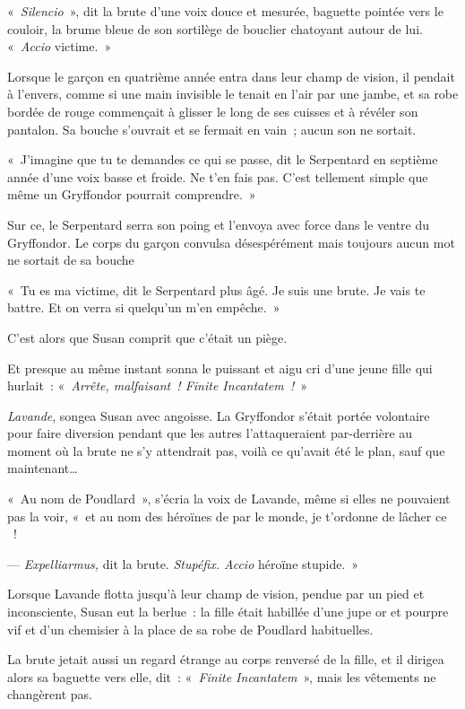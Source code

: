 «~\emph{Silencio}~», dit la brute d'une voix douce et mesurée, baguette pointée vers le couloir, la brume bleue de son sortilège de bouclier chatoyant autour de lui.
«~\emph{Accio} victime.~»

Lorsque le garçon en quatrième année entra dans leur champ de vision, il pendait à l'envers, comme si une main invisible le tenait en l'air par une jambe, et sa robe bordée de rouge commençait à glisser le long de ses cuisses et à révéler son pantalon.
Sa bouche s'ouvrait et se fermait en vain~; aucun son ne sortait.

«~J'imagine que tu te demandes ce qui se passe, dit le Serpentard en septième année d'une voix basse et froide.
Ne t'en fais pas.
C'est tellement simple que même un Gryffondor pourrait comprendre.~»

Sur ce, le Serpentard serra son poing et l'envoya avec force dans le ventre du Gryffondor.
Le corps du garçon convulsa désespérément mais toujours aucun mot ne sortait de sa bouche

«~Tu es ma victime, dit le Serpentard plus âgé.
Je suis une brute.
Je vais te battre.
Et on verra si quelqu'un m'en empêche.~»

C'est alors que Susan comprit que c'était un piège.

Et presque au même instant sonna le puissant et aigu cri d'une jeune fille qui hurlait~: «~\emph{Arrête, malfaisant~!
Finite Incantatem~!}~»

\emph{Lavande}, songea Susan avec angoisse.
La Gryffondor s'était portée volontaire pour faire diversion pendant que les autres l'attaqueraient par-derrière au moment où la brute ne s'y attendrait pas, voilà ce qu'avait été le plan, sauf que maintenant…

«~Au nom de Poudlard~», s'écria la voix de Lavande, même si elles ne pouvaient pas la voir, «~et au nom des héroïnes de par le monde, je t'ordonne de lâcher ce ~!

--- \emph{Expelliarmus,} dit la brute.
\emph{Stupéfix.
Accio} héroïne stupide.~»

Lorsque Lavande flotta jusqu'à leur champ de vision, pendue par un pied et inconsciente, Susan eut la berlue~: la fille était habillée d'une jupe or et pourpre vif et d'un chemisier à la place de sa robe de Poudlard habituelles.

La brute jetait aussi un regard étrange au corps renversé de la fille, et il dirigea alors sa baguette vers elle, dit~: «~\emph{Finite Incantatem}~», mais les vêtements ne changèrent pas.


